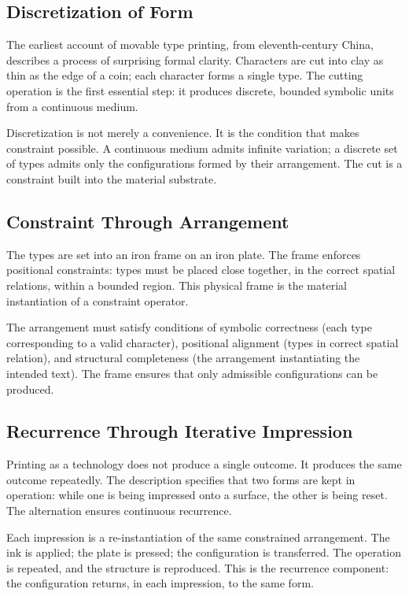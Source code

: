 \documentclass[12pt, oneside]{article}
\theoremstyle{definition}
\theoremstyle{remark}
\begin{document}
\subsection{Discretization of Form}

The earliest account of movable type printing, from eleventh-century China, describes a process of surprising formal clarity.
Characters are cut into clay as thin as the edge of a coin; each character forms a single type.
The cutting operation is the first essential step: it produces discrete, bounded symbolic units from a continuous medium.

Discretization is not merely a convenience.
It is the condition that makes constraint possible.
A continuous medium admits infinite variation; a discrete set of types admits only the configurations formed by their arrangement.
The cut is a constraint built into the material substrate.

\subsection{Constraint Through Arrangement}

The types are set into an iron frame on an iron plate.
The frame enforces positional constraints: types must be placed close together, in the correct spatial relations, within a bounded region.
This physical frame is the material instantiation of a constraint operator.

The arrangement must satisfy conditions of symbolic correctness (each type corresponding to a valid character), positional alignment (types in correct spatial relation), and structural completeness (the arrangement instantiating the intended text).
The frame ensures that only admissible configurations can be produced.

\subsection{Recurrence Through Iterative Impression}

Printing as a technology does not produce a single outcome.
It produces the same outcome repeatedly.
The description specifies that two forms are kept in operation: while one is being impressed onto a surface, the other is being reset.
The alternation ensures continuous recurrence.

Each impression is a re-instantiation of the same constrained arrangement.
The ink is applied; the plate is pressed; the configuration is transferred.
The operation is repeated, and the structure is reproduced.
This is the recurrence component: the configuration returns, in each impression, to the same form.
\end{document}

